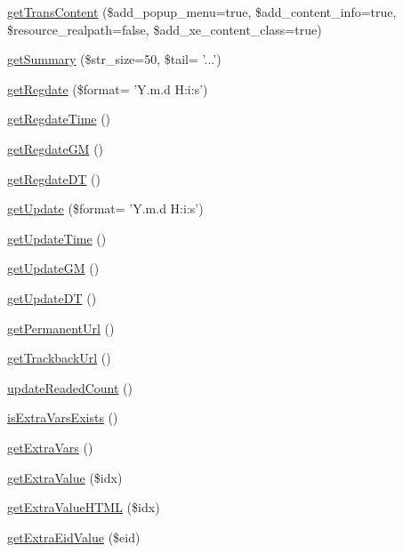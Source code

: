 \begin{DoxyCompactItemize}
\item 
\hyperlink{classdocumentItem_a3143f575cb788ed2317b5697768a6a6f}{get\+Trans\+Content} (\$add\+\_\+popup\+\_\+menu=true, \$add\+\_\+content\+\_\+info=true, \$resource\+\_\+realpath=false, \$add\+\_\+xe\+\_\+content\+\_\+class=true)
\item 
\hyperlink{classdocumentItem_ae79665f63d15ecaeb114d32f1ef37256}{get\+Summary} (\$str\+\_\+size=50, \$tail= '...')
\item 
\hyperlink{classdocumentItem_af648c02eaaf148c374a7bfcdd968ff92}{get\+Regdate} (\$format= 'Y.\+m.\+d H\+:i\+:s')
\item 
\hyperlink{classdocumentItem_ac5d8db0250cc8f448d9a76aaa3afa953}{get\+Regdate\+Time} ()
\item 
\hyperlink{classdocumentItem_a7bd6f9adea145314a87c95b13f6e0bd7}{get\+Regdate\+G\+M} ()
\item 
\hyperlink{classdocumentItem_a30f4ec669361717a82e5dee9c9b3868f}{get\+Regdate\+D\+T} ()
\item 
\hyperlink{classdocumentItem_acdd6ff630a1cc11f2d664fdec740ae0c}{get\+Update} (\$format= 'Y.\+m.\+d H\+:i\+:s')
\item 
\hyperlink{classdocumentItem_a026c6426bea71f9ab86a4f4a7dcff6d9}{get\+Update\+Time} ()
\item 
\hyperlink{classdocumentItem_a6bb6ee1c20e63af811ebd2c6993e898f}{get\+Update\+G\+M} ()
\item 
\hyperlink{classdocumentItem_a05139ae1f3934a4db14e4d73b504f534}{get\+Update\+D\+T} ()
\item 
\hyperlink{classdocumentItem_a8583e18888f4ad634ec23c7cd85dc172}{get\+Permanent\+Url} ()
\item 
\hyperlink{classdocumentItem_a38db599ef3ca4f789475d7e8cceb13da}{get\+Trackback\+Url} ()
\item 
\hyperlink{classdocumentItem_ac268c88d87f12155e5885510213028e3}{update\+Readed\+Count} ()
\item 
\hyperlink{classdocumentItem_ac51058096d79221c90595564e3dbdb82}{is\+Extra\+Vars\+Exists} ()
\item 
\hyperlink{classdocumentItem_afe41c70dfb21cc8b8d397a3af24eb895}{get\+Extra\+Vars} ()
\item 
\hyperlink{classdocumentItem_a5b0cd52819bcb058a7e8a6764aef79d1}{get\+Extra\+Value} (\$idx)
\item 
\hyperlink{classdocumentItem_a0100c3b24a5c4b75b0edc1bfd139e77a}{get\+Extra\+Value\+H\+T\+M\+L} (\$idx)
\item 
\hyperlink{classdocumentItem_a9c2574375684cd06a16532744e279c65}{get\+Extra\+Eid\+Value} (\$eid)

\end{DoxyCompactItemize}
